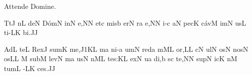 \def\intralink#1{%
  \setbox\linkbox=\hbox{$\smile$}%
  \setbox\wordbox=\hbox{#1}%
  \setbox\linkbox=\hbox to\wd\wordbox{%
    \hss
    \lower\ht\linkbox\hbox{%
      \lower1pt\hbox{%
	\relax
	  \hbox{$\smile$}%
	}}%
    \hss}%
  \dp\linkbox=0pt
  \box\wordbox \llap{\box\linkbox}}





\beginhymn Attende Domine.

\nosolesmescustos
{}\Internote
{}
\initiumgregorianum
{}%
\sgn {}Tt\punctum J\egn
{}n\punctum L\egn
\sgn de{}\punctum N\egn
\spatium
\sgn D{\'o}m\engl{}\punctum N\egn
\sgn {}in\punctum N\egn
\sgn {}e,\punctum N\augmentum N\egn
\spatium
\sgn {}et\punctum c\egn
\spatium
\sgn mis\engl{}\punctum b\egn
\sgn {}er\punctum N\egn
{}r\punctum a\egn
\sgn {}e,\punctum N\augmentum N\egn
\spatium
\divisiominor
\spatium
{}i-\punctum c\egn
\sgn {}a{}\punctum N\egn
\spatium
\sgn pec\punctum K\egn
\sgn c{\'a}v\punctum M\egn
\sgn {}im\punctum N\egn
\sgn {}us\punctum L\egn
\spatium
\sgn t{i}-\clivis LK\egn
\sgn bi.\punctum J\augmentum J\egn
\spatium
\Finisgregoriana

\medskip

\nosolesmescustos
{}\Internote
{}
\initiumgregorianum
{}%
\sgn {}Ad\punctum L\egn
\spatium
\sgn te{}\punctum L\egn
\spatium
\sgn Rex\punctum J\egn
\spatium
\sgn s{u}m\punctum K\egn
\sgn me,\episem J1\pes KL\egn
\spatium
{}m\punctum a\egn
\sgn ni-\punctum a\egn
\sgn {}um\punctum N\egn
\spatium
\sgn red\punctum a\egn
{}m\clivis ML\egn
{}o{r,}\punctum L\augmentum L\egn
\spatium
\divisiominor
\spatium
{}c\punctum N\egn
\sgn {}ul\punctum N\egn
\sgn {}os\punctum N\egn
\spatium
\sgn n{o}s\punctum N\egn
{}os\punctum L\augmentum L\egn
\spatium
\custos M
\lineaproxima
\sgn sub\punctum M\egn
\sgn lev\punctum N\egn
{}m\punctum a\egn
\sgn {}us\punctum N\egn
\spatium
{}n\clivis ML\egn
\sgn te{s:}\punctum K\augmentum L\egn
\spatium
\divisiominor
\spatium
\sgn {}ex\punctum N\egn
{}u\punctum a\egn
\sgn di,\punctum b\egn
\spatium
{}s\punctum c\egn
\sgn te,\punctum N\augmentum N\egn
\spatium
\sgn sup\punctum N\egn
{}ic\punctum K\egn
{}n\punctum M\egn
\sgn tum\punctum L\egn
\spatium
{}-\clivis LK\egn
\sgn ce{s.}\punctum J\augmentum J\egn
\Finisgregoriana

